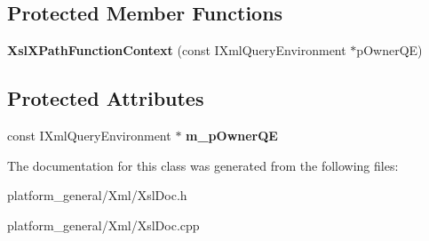\subsection*{\-Protected \-Member \-Functions}
\begin{DoxyCompactItemize}
\item 
\hypertarget{classgeneral__server_1_1XslXPathFunctionContext_a3a22a1489c4d0bf1e0af4840cf568cb7}{{\bfseries \-Xsl\-X\-Path\-Function\-Context} (const \-I\-Xml\-Query\-Environment $\ast$p\-Owner\-Q\-E)}\label{classgeneral__server_1_1XslXPathFunctionContext_a3a22a1489c4d0bf1e0af4840cf568cb7}

\end{DoxyCompactItemize}
\subsection*{\-Protected \-Attributes}
\begin{DoxyCompactItemize}
\item 
\hypertarget{classgeneral__server_1_1XslXPathFunctionContext_a2d6266d65e4c3acf9c4e678955447bfa}{const \-I\-Xml\-Query\-Environment $\ast$ {\bfseries m\-\_\-p\-Owner\-Q\-E}}\label{classgeneral__server_1_1XslXPathFunctionContext_a2d6266d65e4c3acf9c4e678955447bfa}

\end{DoxyCompactItemize}


\-The documentation for this class was generated from the following files\-:\begin{DoxyCompactItemize}
\item 
platform\-\_\-general/\-Xml/\-Xsl\-Doc.\-h\item 
platform\-\_\-general/\-Xml/\-Xsl\-Doc.\-cpp\end{DoxyCompactItemize}
